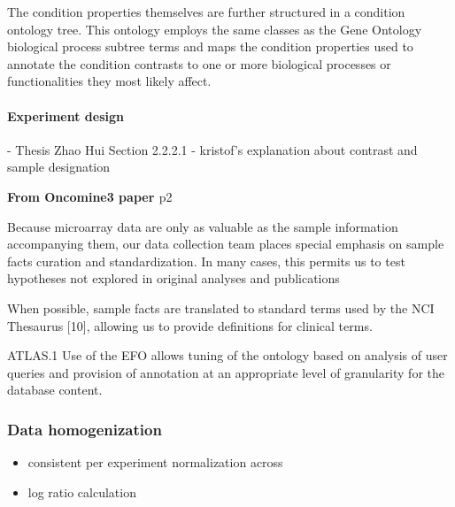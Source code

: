 The condition properties themselves are further structured in a condition
ontology tree.
%
This ontology employs the same classes as the Gene Ontology biological process
subtree terms \cite{Gene2010} and maps the condition properties used to
annotate the condition contrasts to one or more biological processes or
functionalities they most likely affect.



\paragraph{Experiment design}

- Thesis Zhao Hui Section 2.2.2.1
- kristof's explanation about contrast and sample designation


\textbf{From Oncomine3 paper \cite{Rhodes2007}} p2

Because microarray data are only as valuable as the sample information
accompanying them, our data collection team places special
emphasis on sample facts curation and standardization. In
many cases, this permits us to test hypotheses not explored
in original analyses and publications 

When possible, sample facts are translated to standard terms used
by the NCI Thesaurus [10], allowing us to provide definitions
for clinical terms.




\cite{Parkinson2009} ATLAS.1
Use of the EFO allows
tuning of the ontology based on analysis of user queries
and provision of annotation at an appropriate level of
granularity for the database content. 




\subsubsection{Data homogenization}

\begin{itemize}
\item consistent per experiment normalization across
\item log ratio calculation
\end{itemize}

